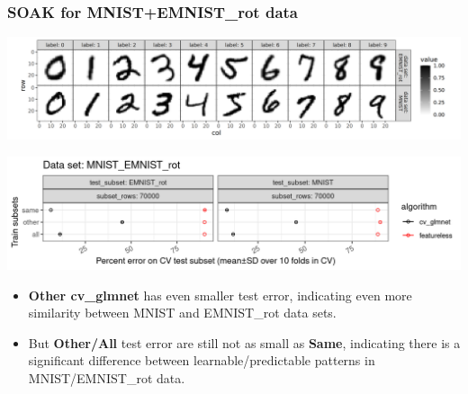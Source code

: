 \documentclass[t]{beamer}
\begin{document}
\begin{frame}
  \frametitle{SOAK for MNIST+EMNIST\_rot data}

  \includegraphics[width=\textwidth]{data_Classif_MNIST_other_EMNIST_rot.png}
  
  \includegraphics[width=\textwidth]{MNIST_EMNIST_rot_error_glmnet_featureless_mean_SD.png}
  \begin{itemize}
  \item \textbf{Other cv\_glmnet} has even smaller test error,
    indicating even more similarity between MNIST and EMNIST\_rot data
    sets.
  \item But \textbf{Other/All} test error are still not as small as \textbf{Same},
    indicating there is a significant difference between
    learnable/predictable patterns in MNIST/EMNIST\_rot data.
  \end{itemize}
\end{frame}
\end{document}
